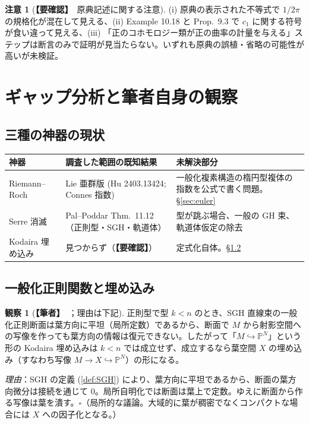 \documentclass[11pt,a4paper]{article}
\theoremstyle{definition}
\newtheorem{rem}[defn]{注意}
\newtheorem{obs}[defn]{観察}
\newcommand{\own}{\textcolor{red!65!black}{\textbf{【筆者】}}}
\newcommand{\chk}{\textcolor{orange!80!black}{\textbf{【要確認】}}}
\begin{document}
\begin{rem}[\chk\ 原典記述に関する注意]
(i) 原典の表示された不等式で $1/2\pi$ の規格化が混在して見える、(ii) Example 10.18 と Prop.\ 9.3 で $c_1$ に関する符号が食い違って見える、(iii) 「正のコホモロジー類が正の曲率の計量を与える」ステップは断言のみで証明が見当たらない。いずれも原典の誤植・省略の可能性が高いが未検証。
\end{rem}

\section{ギャップ分析と筆者自身の観察}\label{sec:own}
\subsection{三種の神器の現状}
\begin{center}
\small
\begin{tabular}{p{2.6cm}p{5.4cm}p{6.3cm}}
\toprule 神器 & 調査した範囲の既知結果 & 未解決部分\\ \midrule
Riemann--Roch & Lie 亜群版 (Hu 2403.13424; Connes 指数) & 一般化複素構造の楕円型複体の指数を公式で書く問題。\S\ref{sec:euler}\\
Serre 消滅 & Pal--Poddar Thm.\ 11.12（正則型・SGH・軌道体） & 型が跳ぶ場合、一般の GH 束、軌道体仮定の除去\\
Kodaira 埋め込み & 見つからず（\chk） & 定式化自体。\S\ref{sec:ghfun}\\
\bottomrule
\end{tabular}
\end{center}

\subsection{一般化正則関数と埋め込み}\label{sec:ghfun}
\begin{obs}[\own\ ；理由は下記]
正則型で型 $k<n$ のとき、SGH 直線束の一般化正則断面は葉方向に平坦（局所定数）であるから、断面で $M$ から射影空間への写像を作っても葉方向の情報は復元できない。したがって「$M\hookrightarrow\mathbb P^N$」という形の Kodaira 埋め込みは $k<n$ では成立せず、成立するなら葉空間 $X$ の埋め込み（すなわち写像 $M\to X\hookrightarrow\mathbb P^N$）の形になる。
\end{obs}
\emph{理由}：SGH の定義 (\ref{def:SGH}) により、葉方向に平坦であるから、断面の葉方向微分は接続を通じて 0。局所自明化では断面は葉上で定数。ゆえに断面から作る写像は葉を潰す。$\square$（局所的な議論。大域的に葉が稠密でなくコンパクトな場合には $X$ への因子化となる。）
\end{document}
